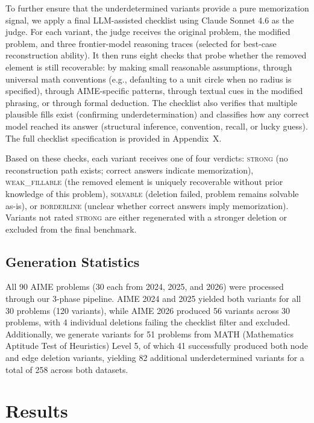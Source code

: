 \documentclass{article} %
\begin{document}
To further ensure that the underdetermined variants provide a pure memorization signal, we apply a final LLM-assisted checklist using Claude Sonnet 4.6 as the judge. For each variant, the judge receives the original problem, the modified problem, and three frontier-model reasoning traces (selected for best-case reconstruction ability). It then runs eight checks that probe whether the removed element is still recoverable: by making small reasonable assumptions, through universal math conventions (e.g., defaulting to a unit circle when no radius is specified), through AIME-specific patterns, through textual cues in the modified phrasing, or through formal deduction. The checklist also verifies that multiple plausible fills exist (confirming underdetermination) and classifies how any correct model reached its answer (structural inference, convention, recall, or lucky guess). The full checklist specification is provided in Appendix~X.

Based on these checks, each variant receives one of four verdicts: \textsc{strong} (no reconstruction path exists; correct answers indicate memorization), \textsc{weak\_fillable} (the removed element is uniquely recoverable without prior knowledge of this problem), \textsc{solvable} (deletion failed, problem remains solvable as-is), or \textsc{borderline} (unclear whether correct answers imply memorization). Variants not rated \textsc{strong} are either regenerated with a stronger deletion or excluded from the final benchmark.

\subsection{Generation Statistics}
\label{sec:stats}

All 90 AIME problems (30 each from 2024, 2025, and 2026) were processed through our 3-phase pipeline. AIME 2024 and 2025 yielded both variants for all 30 problems (120 variants), while AIME 2026 produced 56 variants across 30 problems, with 4 individual deletions failing the checklist filter and excluded. Additionally, we generate variants for 51 problems from MATH (Mathematics Aptitude Test of Heuristics) Level 5, of which 41 successfully produced both node and edge deletion variants, yielding 82 additional underdetermined variants for a total of 258 across both datasets.


\section{Results}
\label{sec:results}
\end{document}
